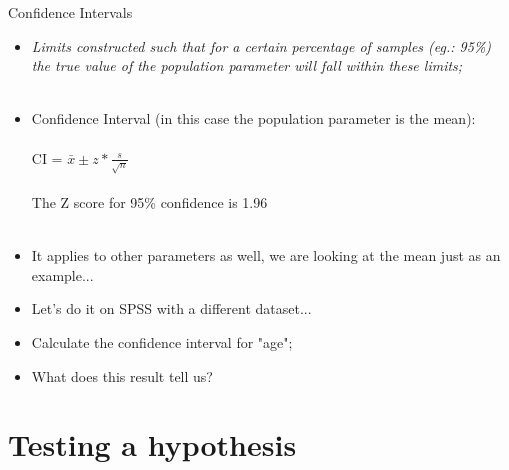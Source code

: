 \documentclass[10pt]{beamer}   %
\begin{document}
\begin{frame}{Confidence Intervals}

\begin{itemize}

\item \textit{Limits constructed such that for a certain percentage of samples (eg.: 95\%) the true value of the population parameter will fall within these limits;} \\~\\ 
\item Confidence Interval (in this case the population parameter is the mean): \\~\\  CI = $\bar{x} \pm z *\frac{s}{\sqrt{n}}$  \\~\\
The Z score for 95\% confidence is 1.96   \\~\\
 \item It applies to other parameters as well, we are looking at the mean just as an example... \pause 
\item  Let's do it on SPSS with a different dataset...\pause
\item Calculate the confidence interval for "age"; \pause
\item What does this result tell us? \pause

\end{itemize}

\end{frame}


\section{Testing a hypothesis}

\end{document}
